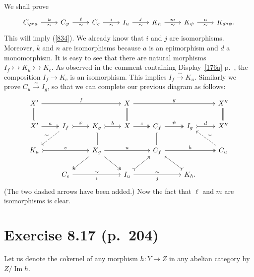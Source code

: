 \documentclass[12pt]{article}
\theoremstyle{remark}%
\newcommand{\mono}{\rightarrowtail}
\newcommand{\p}{\varphi}
\newcommand{\xr}{\xrightarrow}
\newcommand{\ccd}{the comment containing Display}
\DeclareMathOperator{\Ima}{Im}
\begin{document}
We shall prove 
$$
\begin{tikzcd}
C_{\p\circ a}\ar{r}{k}[swap]{\sim}&C_\p\ar{r}{\ell}[swap]{\sim}&C_e\ar{r}{i}[swap]{\sim}&I_u\ar{r}{j}[swap]{\sim}&K_h\ar{r}{m}[swap]{\sim}&K_\psi\ar{r}{n}[swap]{\sim}&K_{d\circ\psi}.
\end{tikzcd}
$$
This will imply (\ref{834}). We already know that $i$ and $j$ are isomorphisms. Moreover, $k$ and $n$ are isomorphisms because $a$ is an epimorphism and $d$ a monomorphism. It is easy to see that there are natural morphisms $I_f\mono K_u\mono K_c$. As observed in \ccd\ \eqref{176a} p.~\pageref{176a}, the composition $I_f\to K_c$ is an isomorphism. This implies $I_f\xr\sim K_u$. Similarly we prove $C_u\xr\sim I_g$, so that we can complete our previous diagram as follows: 
$$
\begin{tikzcd}
X'\ar{rrr}{f}\ar[equal]{d}&&&X\ar[equal]{d}\ar{rrr}{g}&&&X''\ar[equal]{d}\\ 
X'\ar[two heads]{r}{a}&I_f\ar[dashed]{dl}[swap]{\sim}\ar[tail]{r}{\p}&K_g\ar[equal]{d}\ar[tail]{r}{b}&X\ar[two heads]{r}{c}&C_f\ar[equal]{d}\ar[two heads]{r}{\psi}&I_g\ar[tail]{r}{d}&X''\\ 
K_u\ar[tail]{rr}{e}&&K_g\ar[two heads]{dl}\ar[two heads]{dr}\ar{rr}{u}&&C_f\ar[two heads]{rr}{h}&&C_u\ar[dashed]{ul}[swap]{\sim}\\ 
&C_e\ar{rr}{\sim}[swap]{i}&&I_u\ar[tail]{ur}\ar{rr}{\sim}[swap]{j}&&K_h.\ar[tail]{ul}
\end{tikzcd}
$$ 
(The two dashed arrows have been added.) Now the fact that $\ell$ and $m$ are isomorphisms is clear. 
%
\section{Exercise 8.17 (p.~204)}\label{817} 
%
Let us denote the cokernel of any morphism $h:Y\to Z$ in any abelian category by $Z/\Ima h$. 
\end{document}
